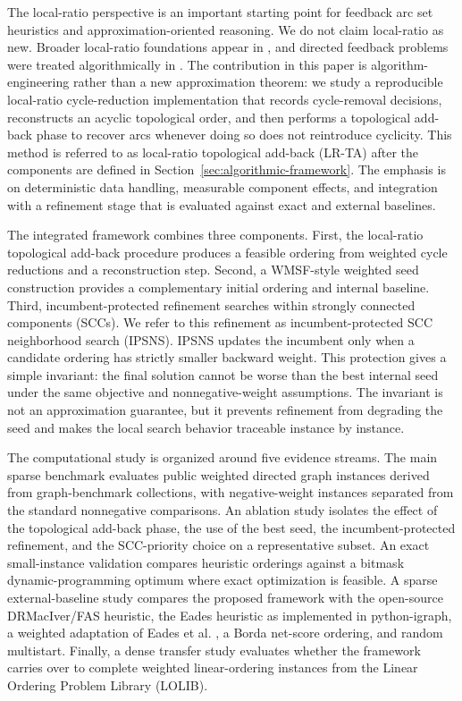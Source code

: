 The local-ratio perspective is an important starting point for feedback arc set heuristics and approximation-oriented reasoning. We do not claim local-ratio as new. Broader local-ratio foundations appear in \cite{BYGR98}, and directed feedback problems were treated algorithmically in \cite{DF03}. The contribution in this paper is algorithm-engineering rather than a new approximation theorem: we study a reproducible local-ratio cycle-reduction implementation that records cycle-removal decisions, reconstructs an acyclic topological order, and then performs a topological add-back phase to recover arcs whenever doing so does not reintroduce cyclicity. This method is referred to as local-ratio topological add-back (LR-TA) after the components are defined in Section~\ref{sec:algorithmic-framework}. The emphasis is on deterministic data handling, measurable component effects, and integration with a refinement stage that is evaluated against exact and external baselines.

The integrated framework combines three components. First, the local-ratio topological add-back procedure produces a feasible ordering from weighted cycle reductions and a reconstruction step. Second, a WMSF-style weighted seed construction provides a complementary initial ordering and internal baseline. Third, incumbent-protected refinement searches within strongly connected components (SCCs). We refer to this refinement as incumbent-protected SCC neighborhood search (IPSNS). IPSNS updates the incumbent only when a candidate ordering has strictly smaller backward weight. This protection gives a simple invariant: the final solution cannot be worse than the best internal seed under the same objective and nonnegative-weight assumptions. The invariant is not an approximation guarantee, but it prevents refinement from degrading the seed and makes the local search behavior traceable instance by instance.

The computational study is organized around five evidence streams. The main sparse benchmark evaluates public weighted directed graph instances derived from graph-benchmark collections, with negative-weight instances separated from the standard nonnegative comparisons. An ablation study isolates the effect of the topological add-back phase, the use of the best seed, the incumbent-protected refinement, and the SCC-priority choice on a representative subset. An exact small-instance validation compares heuristic orderings against a bitmask dynamic-programming optimum where exact optimization is feasible. A sparse external-baseline study compares the proposed framework with the open-source DRMacIver/FAS heuristic, the Eades heuristic as implemented in python-igraph, a weighted adaptation of Eades et al. \cite{ELS93}, a Borda net-score ordering, and random multistart. Finally, a dense transfer study evaluates whether the framework carries over to complete weighted linear-ordering instances from the Linear Ordering Problem Library (LOLIB).

